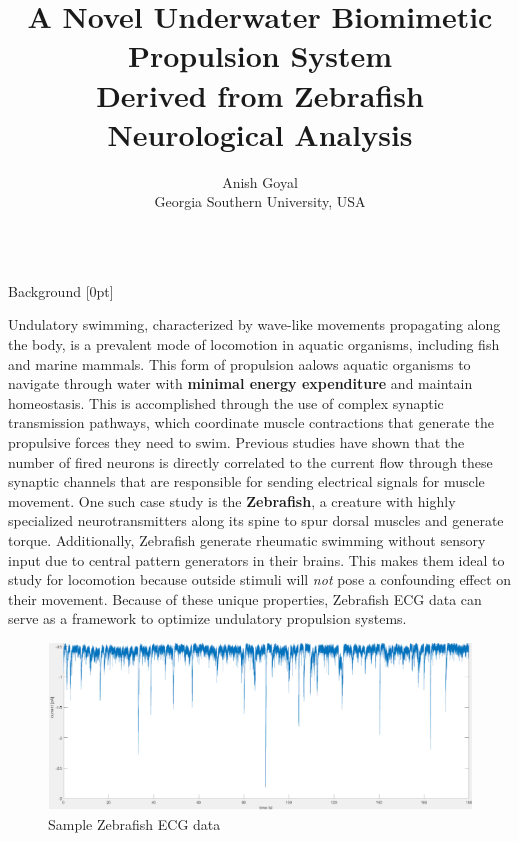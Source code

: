\documentclass[final, 16pt]{beamer}
\title{\vspace{0.75cm}A Novel Underwater Biomimetic Propulsion System \\ Derived from Zebrafish Neurological Analysis}
\author{\huge Anish Goyal \\ \huge Georgia Southern University, USA}
\newlength{\colwidth}
\begin{document}
\setlength{\columnsep}{50pt}

\begin{frame}[t]
\centering

\begin{columns}[t]
\margincolumn

\fontsize{22}{26}\selectfont

\begin{column}{\colwidth}
  \fontsize{22}{24}\selectfont

  \begin{block}{Background}
    [0pt]

    \vspace{0.5cm}

    Undulatory swimming, characterized by wave-like movements propagating along the body, is a prevalent mode of locomotion in aquatic organisms, including fish and marine mammals. This form of propulsion aalows aquatic organisms to navigate through water with \textbf{minimal energy expenditure} and maintain homeostasis. This is accomplished through the use of complex synaptic transmission pathways, which coordinate muscle contractions that generate the propulsive forces they need to swim. Previous studies have shown that the number of fired neurons is directly correlated to the current flow through these synaptic channels that are responsible for sending electrical signals for muscle movement. One such case study is the \textbf{Zebrafish}, a creature with highly specialized neurotransmitters along its spine to spur dorsal muscles and generate torque. Additionally, Zebrafish generate rheumatic swimming without sensory input due to central pattern generators in their brains. This makes them ideal to study for locomotion because outside stimuli will \emph{not} pose a confounding effect on their movement. Because of these unique properties, Zebrafish ECG data can serve as a framework to optimize undulatory propulsion systems.

    \begin{multicols}{2}
      \begin{figure}[H]
        \centering
        \includegraphics[width=0.95\linewidth, height=0.65\linewidth]{img/ECG_Data.png}
        \caption{Sample Zebrafish ECG data}
        \label{fig:ecg-data}
      \end{figure}
      

\end{multicols}
\end{block}
\end{column}
\end{columns}
\end{frame}
\end{document}
